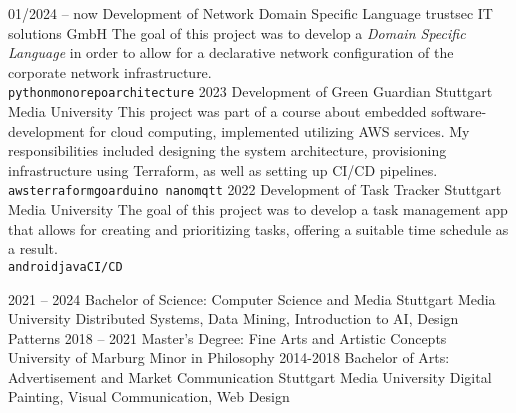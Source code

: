 \documentclass[9pt]{developercv} %
\begin{document}


\begin{entrylist}
	\entry
	{01/2024 -- now}
	{Development of Network Domain Specific Language}
	{trustsec IT solutions GmbH}
	{The goal of this project was to develop a \emph{Domain Specific Language} in order to allow for a declarative network configuration of the corporate network infrastructure.
	\\ \texttt{python}\slashsep\texttt{monorepo}\slashsep\texttt{architecture}}
	\entry
	{2023}
	{Development of Green Guardian}
	{Stuttgart Media University}
	{This project was part of a course about embedded software-development for cloud computing, implemented utilizing AWS services. My responsibilities included designing the system architecture, provisioning infrastructure using Terraform, as well as setting up CI/CD pipelines.
		\\ \texttt{aws}\slashsep\texttt{terraform}\slashsep\texttt{go}\slashsep\texttt{arduino nano}\slashsep\texttt{mqtt}}
	\entry
	{2022}
	{Development of Task Tracker}
	{Stuttgart Media University}
	{The goal of this project was to develop a task management app that allows for creating and prioritizing tasks, offering a suitable time schedule as a result.
		\\ \texttt{android}\slashsep\texttt{java}\slashsep\texttt{CI/CD}}
\end{entrylist}



\begin{entrylist}
	\entry
	{2021 -- 2024}
	{Bachelor of Science: Computer Science and Media}
	{Stuttgart Media University}
	{Distributed Systems, Data Mining, Introduction to AI, Design Patterns}
\entry
	{2018 -- 2021}
	{Master's Degree: Fine Arts and Artistic Concepts}
	{University of Marburg}
	{Minor in Philosophy}
\entry
	{2014-2018}
	{Bachelor of Arts: Advertisement and Market Communication}
	{Stuttgart Media University}
	{Digital Painting, Visual Communication, Web Design}
\end{entrylist}
\end{document}
